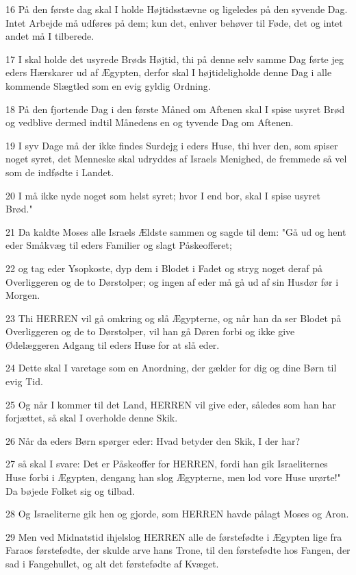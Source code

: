 \par 16 På den første dag skal I holde Højtidsstævne og ligeledes på den syvende Dag. Intet Arbejde må udføres på dem; kun det, enhver behøver til Føde, det og intet andet må I tilberede.
\par 17 I skal holde det usyrede Brøds Højtid, thi på denne selv samme Dag førte jeg eders Hærskarer ud af Ægypten, derfor skal I højtideligholde denne Dag i alle kommende Slægtled som en evig gyldig Ordning.
\par 18 På den fjortende Dag i den første Måned om Aftenen skal I spise usyret Brød og vedblive dermed indtil Månedens en og tyvende Dag om Aftenen.
\par 19 I syv Dage må der ikke findes Surdejg i eders Huse, thi hver den, som spiser noget syret, det Menneske skal udryddes af Israels Menighed, de fremmede så vel som de indfødte i Landet.
\par 20 I må ikke nyde noget som helst syret; hvor I end bor, skal I spise usyret Brød."
\par 21 Da kaldte Moses alle Israels Ældste sammen og sagde til dem: "Gå ud og hent eder Småkvæg til eders Familier og slagt Påskeofferet;
\par 22 og tag eder Ysopkoste, dyp dem i Blodet i Fadet og stryg noget deraf på Overliggeren og de to Dørstolper; og ingen af eder må gå ud af sin Husdør før i Morgen.
\par 23 Thi HERREN vil gå omkring og slå Ægypterne, og når han da ser Blodet på Overliggeren og de to Dørstolper, vil han gå Døren forbi og ikke give Ødelæggeren Adgang til eders Huse for at slå eder.
\par 24 Dette skal I varetage som en Anordning, der gælder for dig og dine Børn til evig Tid.
\par 25 Og når I kommer til det Land, HERREN vil give eder, således som han har forjættet, så skal I overholde denne Skik.
\par 26 Når da eders Børn spørger eder: Hvad betyder den Skik, I der har?
\par 27 så skal I svare: Det er Påskeoffer for HERREN, fordi han gik Israeliternes Huse forbi i Ægypten, dengang han slog Ægypterne, men lod vore Huse urørte!" Da bøjede Folket sig og tilbad.
\par 28 Og Israeliterne gik hen og gjorde, som HERREN havde pålagt Moses og Aron.
\par 29 Men ved Midnatstid ihjelslog HERREN alle de førstefødte i Ægypten lige fra Faraos førstefødte, der skulde arve hans Trone, til den førstefødte hos Fangen, der sad i Fangehullet, og alt det førstefødte af Kvæget.
